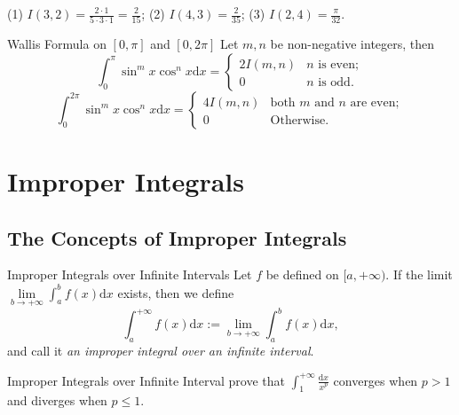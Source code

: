 \begin{solution}
  (1) $I(3, 2) = \frac{2 \cdot 1}{5 \cdot 3 \cdot 1} = \frac{2}{15}$;
  (2) $I(4, 3) = \frac{2}{35}$;
  (3) $I(2, 4) = \frac{\pi}{32}$.
\end{solution}

\begin{corollary}{Wallis Formula on $[0, \pi]$ and $[0, 2\pi]$}{}
  Let $m, n$ be non-negative integers, then
  \begin{equation}
    \int_0^{\pi} \sin^m x \cos^n x \mathrm{d} x =
    \begin{cases}
      2I(m, n) & \text{$n$ is even};\\
      0 & \text{$n$ is odd}.
    \end{cases}
  \end{equation}
  \begin{equation}
    \int_0^{2\pi} \sin^m x \cos^n x \mathrm{d} x =
    \begin{cases}
      4I(m, n) & \text{both $m$ and $n$ are even};\\
      0 & \text{Otherwise}.
    \end{cases}
  \end{equation}
\end{corollary}


\section{Improper Integrals}

\subsection{The Concepts of Improper Integrals}

\begin{definition}{Improper Integrals over Infinite Intervals}{}
  Let $f$ be defined on $[a, +\infty)$.
  If the limit $\lim \limits _{b \rightarrow +\infty} \int_a^b f(x)\mathrm{d} x$
  exists,
  then we define
  \begin{equation}
    \int_a^{+\infty} f(x) \mathrm{d} x := \lim \limits _{b \rightarrow +\infty} \int_a^b f(x)\mathrm{d} x,
  \end{equation}
  and call it \emph{an improper integral over an infinite interval}.
\end{definition}

\begin{example}{Improper Integrals over Infinite Interval}{}
  prove that $\int_1^{+\infty} \frac{\mathrm{d}x}{x^p}$ converges when $p > 1$
  and diverges when $p \leq 1$.
\end{example}


